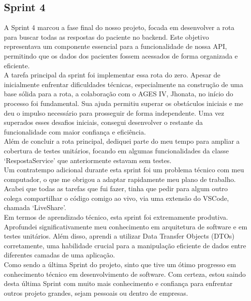 \subsection{Sprint 4}

A Sprint 4 marcou a fase final do nosso projeto, focada em desenvolver a rota para buscar todas as respostas do paciente no backend. Este objetivo representava um componente essencial para a funcionalidade de nossa API, permitindo que os dados dos pacientes fossem acessados de forma organizada e eficiente.\\

A tarefa principal da sprint foi implementar essa rota do zero. Apesar de inicialmente enfrentar dificuldades técnicas, especialmente na construção de uma base sólida para a rota, a colaboração com o AGES IV, Jhonata, no início do processo foi fundamental. Sua ajuda permitiu superar os obstáculos iniciais e me deu o impulso necessário para prosseguir de forma independente. Uma vez superados esses desafios iniciais, consegui desenvolver o restante da funcionalidade com maior confiança e eficiência.\\

Além de concluir a rota principal, dediquei parte do meu tempo para ampliar a cobertura de testes unitários, focando em algumas funcionalidades da classe ‘RespostaService’ que anteriormente estavam sem testes.\\

Um contratempo adicional durante esta sprint foi um problema técnico com meu computador, o que me obrigou a adaptar rapidamente meu plano de trabalho. Acabei que todas as tarefas que fui fazer, tinha que pedir para algum outro colega compartilhar o código comigo ao vivo, via uma extensão do VSCode, chamada ‘LiveShare’.\\

Em termos de aprendizado técnico, esta sprint foi extremamente produtiva. Aprofundei significativamente meu conhecimento em arquitetura de software e em testes unitários. Além disso, aprendi a utilizar Data Transfer Objects (DTOs) corretamente, uma habilidade crucial para a manipulação eficiente de dados entre diferentes camadas de uma aplicação.\\

Como sendo a última Sprint do projeto, sinto que tive um ótimo progresso em conhecimento técnico em desenvolvimento de software. Com certeza, estou saindo desta última Sprint com muito mais conhecimento e confiança para enfrentar outros projeto grandes, sejam pessoais ou dentro de empresas.
